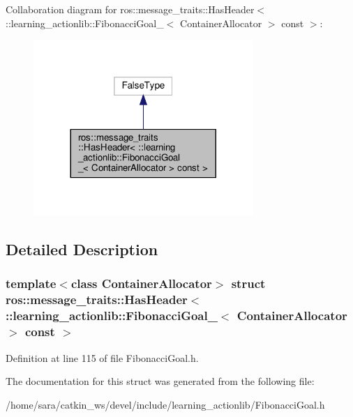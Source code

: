 Collaboration diagram for ros\+:\+:message\+\_\+traits\+:\+:Has\+Header$<$ \+:\+:learning\+\_\+actionlib\+:\+:Fibonacci\+Goal\+\_\+$<$ Container\+Allocator $>$ const $>$\+:
\nopagebreak
\begin{figure}[H]
\begin{center}
\leavevmode
\includegraphics[width=236pt]{structros_1_1message__traits_1_1HasHeader_3_01_1_1learning__actionlib_1_1FibonacciGoal___3_01Cona70977b5f54c9542446f04dae32703c5}
\end{center}
\end{figure}


\subsection{Detailed Description}
\subsubsection*{template$<$class Container\+Allocator$>$\newline
struct ros\+::message\+\_\+traits\+::\+Has\+Header$<$ \+::learning\+\_\+actionlib\+::\+Fibonacci\+Goal\+\_\+$<$ Container\+Allocator $>$ const $>$}



Definition at line 115 of file Fibonacci\+Goal.\+h.



The documentation for this struct was generated from the following file\+:\begin{DoxyCompactItemize}
\item 
/home/sara/catkin\+\_\+ws/devel/include/learning\+\_\+actionlib/Fibonacci\+Goal.\+h\end{DoxyCompactItemize}
